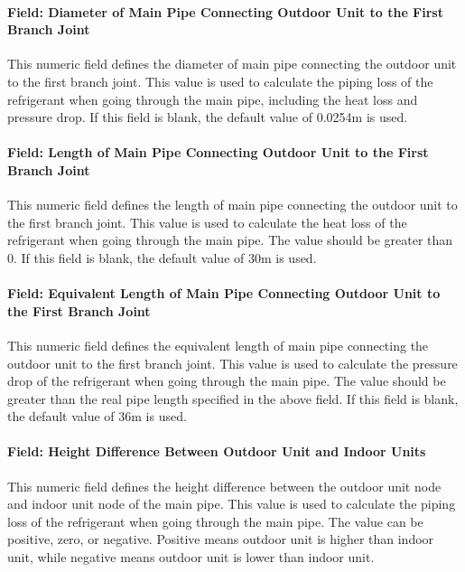 \paragraph{Field: Diameter of Main Pipe Connecting Outdoor Unit to the First Branch Joint}\label{field-diameter-of-main-pipe-connecting-outdoor-unit-to-indoor-units}

This numeric field defines the diameter of main pipe connecting the outdoor unit to the first branch joint. This value is used to calculate the piping loss of the refrigerant when going through the main pipe, including the heat loss and pressure drop. If this field is blank, the default value of 0.0254m is used.

\paragraph{Field: Length of Main Pipe Connecting Outdoor Unit to the First Branch Joint}\label{field-length-of-main-pipe-connecting-outdoor-unit-to-indoor-units}

This numeric field defines the length of main pipe connecting the outdoor unit to the first branch joint. This value is used to calculate the heat loss of the refrigerant when going through the main pipe. The value should be greater than 0. If this field is blank, the default value of 30m is used.

\paragraph{Field: Equivalent Length of Main Pipe Connecting Outdoor Unit to the First Branch Joint}\label{field-equivalent-length-of-main-pipe-connecting-outdoor-unit-to-indoor-units}

This numeric field defines the equivalent length of main pipe connecting the outdoor unit to the first branch joint. This value is used to calculate the pressure drop of the refrigerant when going through the main pipe. The value should be greater than the real pipe length specified in the above field. If this field is blank, the default value of 36m is used.

\paragraph{Field: Height Difference Between Outdoor Unit and Indoor Units}\label{field-height-difference-between-outdoor-unit-and-indoor-units}

This numeric field defines the height difference between the outdoor unit node and indoor unit node of the main pipe. This value is used to calculate the piping loss of the refrigerant when going through the main pipe. The value can be positive, zero, or negative. Positive means outdoor unit is higher than indoor unit, while negative means outdoor unit is lower than indoor unit.

